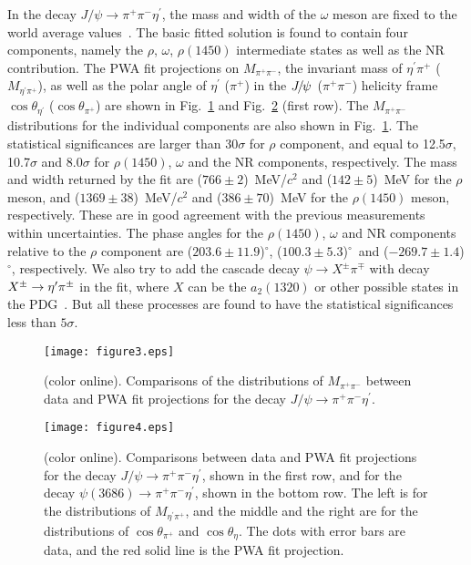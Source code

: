\documentclass[twocolumn,showpacs,aps,prd]{revtex4-1}
\newcommand{\etap}{\eta^{\prime}}
\def\deg{${}^{\circ}$}
\begin{document}
In the decay $J/\psi \to \pi^+\pi^-\eta^\prime$, the mass and width of the $\omega$ meson are fixed to the world average values~\cite{pdg}.
The basic fitted solution is found to contain four components, namely the $\rho$, $\omega$, $\rho(1450)$ intermediate states as well as the NR contribution. The PWA fit projections on $M_{\pi^+\pi^-}$, the invariant mass of $\etap \pi^+$ ($M_{\etap\pi^+}$), as well as the polar angle of $\etap$ ($\pi^{+}$) in the ${J\mskip -3mu/\mskip -2mu\psi\mskip 2mu}$ ($\pi^+\pi^-$) helicity frame $\cos\theta_{\etap}$ ($\cos\theta_{\pi^{+}}$) are
shown in Fig.~\ref{pwa:jpsi} and Fig.~\ref{pwa:jpsi2} (first row). The $M_{\pi^+\pi^-}$ distributions for the individual components are also shown in Fig.~\ref{pwa:jpsi}. The statistical significances are larger than 30$\sigma$ for $\rho$ component, and equal to 12.5$\sigma$, 10.7$\sigma$ and 8.0$\sigma$ for $\rho(1450)$, $\omega$ and the NR components, respectively.
The mass and width returned by the fit are ($766\pm2$)~MeV/$c^{2}$ and ($142\pm5$)~MeV for the $\rho$ meson, and ($1369\pm38$)~MeV/$c^{2}$ and ($386\pm70$)~MeV for the $\rho(1450)$ meson, respectively. These are in good agreement with the previous measurements~\cite{pdg, rho1450} within uncertainties. The phase angles for the $\rho(1450)$, $\omega$ and NR components relative to the $\rho$ component are ($203.6 \pm 11.9$)\deg, ($100.3\pm5.3$)\deg~and ($-269.7\pm1.4$)\deg, respectively. We also try to add the cascade decay $\psi \to X^{\pm} \pi^{\mp}$ with decay $\X^{\pm}\to \etap \pi^{\pm}$ in the fit, where $X$ can be the $a_{2}(1320)$ or other possible states in the PDG~\cite{pdg}. But all these processes are found to have the statistical significances less than $5\sigma$.


\begin{figure}[tb]
  \centering
     \texttt{[image: figure3.eps]}
  \caption{(color online). Comparisons of the distributions of $M_{\pi^+\pi^-}$ between data and PWA fit projections for the decay $J/\psi\to \pi^+\pi^-\eta^\prime$.}
  \label{pwa:jpsi}
\end{figure}
%


\begin{figure}[htbp]
  \centering
   \texttt{[image: figure4.eps]}
  \caption{(color online). Comparisons between data and PWA fit projections for the decay $J/\psi \to \pi^+\pi^-\eta^\prime$, shown in the first row,
  and for the decay $\psi(3686) \to \pi^+\pi^-\eta^\prime$, shown in the bottom row. The left is for the distributions of $M_{\eta^\prime\pi^+}$, and the middle and the right are for the distributions of $\cos\theta_{\pi^{+}}$ and $\cos\theta_{\eta}$. The dots with error bars are data, and the red solid line is
  the PWA fit projection.}
  \label{pwa:jpsi2}
\end{figure}
%
\end{document}
